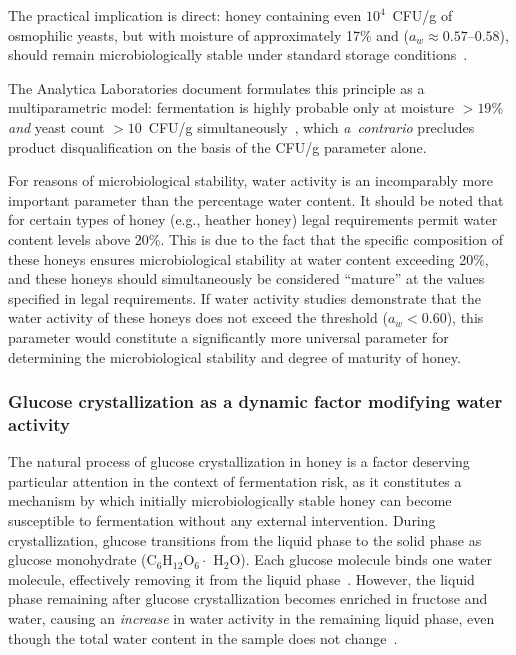 The practical implication is direct: 
honey containing even $10^4$~CFU/g of osmophilic yeasts, but with moisture of approximately 17\% and ($a_w \approx 0.57$--$0.58$), should remain microbiologically stable under standard storage conditions~\cite{alwaili2012}.


The Analytica Laboratories document formulates this principle
as a multiparametric model: fermentation is highly probable only
at moisture $> 19\%$ \emph{and} yeast count $> 10$~CFU/g
simultaneously~\cite{analytica2020}, which \textit{a~contrario}
precludes product disqualification on the basis of the CFU/g
parameter alone.

For reasons of microbiological stability, water activity is an
incomparably more important parameter than the percentage water
content. It should be noted that for certain types of honey
(e.g., heather honey) legal requirements permit water content
levels above 20\%. This is due to the fact that the specific
composition of these honeys ensures microbiological stability at
water content exceeding 20\%, and these honeys should simultaneously
be considered ``mature'' at the values specified in legal
requirements. If water activity studies demonstrate that the water
activity of these honeys does not exceed the threshold
($a_w < 0.60$), this parameter would constitute a significantly
more universal parameter for determining the microbiological
stability and degree of maturity of honey.

\subsubsection{Glucose crystallization as a dynamic factor modifying water activity}

The natural process of glucose crystallization in honey is a factor
deserving particular attention in the context of fermentation risk,
as it constitutes a mechanism by which initially microbiologically
stable honey can become susceptible to fermentation without any
external intervention. During crystallization, glucose transitions
from the liquid phase to the solid phase as glucose monohydrate
(C$_6$H$_{12}$O$_6 \cdot$ H$_2$O). Each glucose molecule binds
one water molecule, effectively removing it from the liquid
phase~\cite{zamora2006}. However, the liquid phase remaining
after glucose crystallization becomes enriched in fructose and
water, causing an \emph{increase} in water activity in the
remaining liquid phase, even though the total water content in
the sample does not change~\cite{zamora2006,ijfans2019}.

